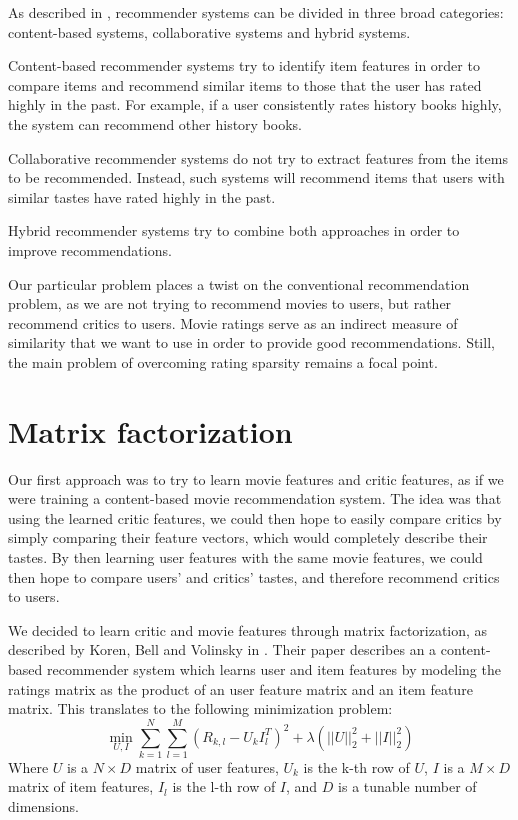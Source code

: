 \documentclass[12pt]{article}
\begin{document}
	As described in \cite{Survey05}, recommender systems can be divided in three broad categories: content-based systems, collaborative systems and hybrid systems. 

	Content-based recommender systems try to identify item features in order to compare items and recommend similar items to those that the user has rated highly in the past.  For example, if a user consistently rates history books highly, the system can recommend other history books.

	Collaborative recommender systems do not try to extract features from the items
	to be recommended. Instead, such systems will recommend items that users with similar tastes have rated highly in the past.

	Hybrid recommender systems try to combine both approaches in order to improve recommendations.

	Our particular problem places a twist on the conventional recommendation problem, as we are not trying to recommend movies to users, but rather recommend critics to users. Movie ratings serve as an indirect measure of similarity that we want to use in order to provide good recommendations. Still, the main problem of overcoming rating sparsity remains a focal point.

\section{Matrix factorization}

	Our first approach was to try to learn movie features and critic features, as if we were training a content-based movie recommendation system. The idea was that using the learned critic features, we could then hope to easily compare critics by simply comparing their feature vectors, which would completely describe their tastes. By then learning user features with the same movie features, we could then hope to compare users' and critics' tastes, and therefore recommend critics to users. 

	We decided to learn critic and movie features through matrix factorization, as described by Koren, Bell and Volinsky in \cite{Koren09}. Their paper describes an a content-based recommender system which learns user and item features by modeling the ratings matrix as the product of an user feature matrix and an item feature matrix. This translates to the following minimization problem:
	$$ \min_{U,I} \sum_{k = 1}^{N} \sum_{l = 1}^{M} (R_{k,l} - U_k I_l^T)^2 + \lambda (||U||_2^2 + ||I||_2^2) $$
	Where $U$ is a $N \times D$ matrix of user features, $U_k$ is the k-th row of $U$, $I$ is a $M \times D$ matrix of item features, $I_l$ is the l-th row of $I$, and $D$ is a tunable number of dimensions.
\end{document}
